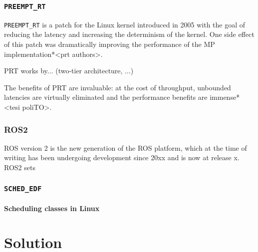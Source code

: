 \documentclass[a4paper,12pt]{report}
\begin{document}
\subsection{\texttt{PREEMPT\_RT}}

\texttt{PREEMPT\_RT} is a patch for the Linux kernel introduced in 2005 with the goal of reducing the latency and increasing the determinism of the kernel\cite{survey-preempt-rt}. One side effect of this patch was dramatically improving the performance of the MP implementation*<prt authors>.

PRT works by... (two-tier architecture, ...)

The benefits of PRT are invaluable: at the cost of throughput, unbounded latencies are virtually eliminated and the performance benefits are immense*<tesi poliTO>.

\subsection{ROS2}

ROS version 2 is the new generation of the ROS platform, which at the time of writing has been undergoing development since 20xx and is now at release x. ROS2 sets




\subsection{\texttt{SCHED\_EDF}}



\subsubsection{Scheduling classes in Linux}




\newpage
\chapter{Solution}
\end{document}
